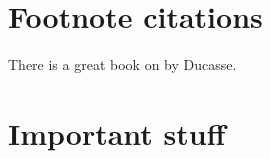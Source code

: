 \documentclass[a4paper,10pt,twoside]{book}
\begin{document}
\section*{Footnote citations}
There is a great book on \sq by Ducasse\cite{Duca05j}.
\section*{Important stuff}
% 


\end{document}
